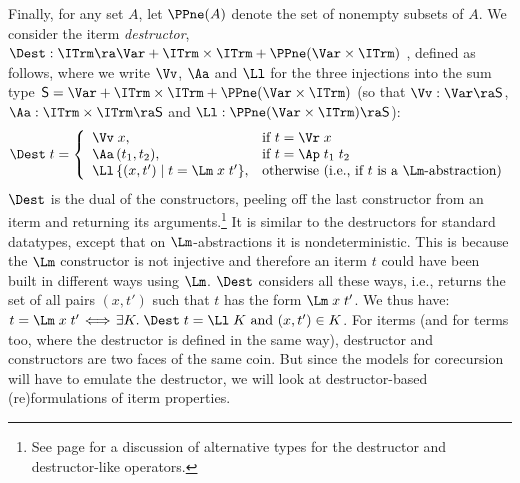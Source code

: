 Finally, for any set $A$, let $\PPne(A)$ denote the set of nonempty subsets of $A$.
We consider the iterm \emph{destructor}, %
$\Dest : \ITrm \ra \Var + 
\ITrm \times \ITrm + \PPne(\Var\times \ITrm)$ , defined as follows, where we write $\Vv$, $\Aa$ and $\Ll$ %
for the three injections into the sum type  $\mathsf{S} = \Var + 
\ITrm \times \ITrm + \PPne(\Var\times \ITrm)$ (so that
$\Vv : \Var \ra \mathsf{S}$, 
$\Aa : \ITrm \times \ITrm \ra \mathsf{S}$ and 
$\Ll : \PPne(\Var\times \ITrm) \ra \mathsf{S}$): 
%
\vspace*{-0.8ex}
$$
\Dest\;t  =\left\{
\begin{array}{ll}
	\Vv\;x, & \mbox{if $t = \Vr\;x$} \\
	\Aa\,(t_1,t_2), & \mbox{if $t = \Ap\;t_1\;t_2$} \\
	\Ll\,\{(x,t') \mid \mbox{$t = \Lm\;x\;t'$}\}, & \mbox{otherwise (i.e., if $t$ is a $\Lm$-abstraction)} \\
	\end{array}
\right.
\vspace*{-0.5ex}
$$
%
$\Dest$ is the dual of the constructors, peeling off the last constructor from an iterm and returning  
its arguments.\footnote{See page \pageref{alterDest} for a discussion of alternative types for the destructor and destructor-like operators.} 
It is similar to the destructors for standard datatypes, except that on $\Lm$-abstractions it is nondeterministic. 
This is because the $\Lm$ constructor is not injective and therefore an iterm $t$ could have been built in 
different ways using $\Lm$. $\Dest$ considers all these ways, i.e., returns the set of all pairs $(x,t')$ such that $t$ has the form $\Lm\;x\;t'$.  
We thus have: $t = \Lm\;x\;t' \!\iff\! \exists K.\; \Dest\;t = \Ll\;K \mbox{ and } (x,t') \in K$. 
%
%
For iterms (and for terms too, where the destructor is defined in the same way), destructor and constructors are two faces of the same coin. 
But %
since the models for corecursion will have to emulate the destructor, 
we will %
look at 
destructor-based (re)formulations of iterm properties. %

